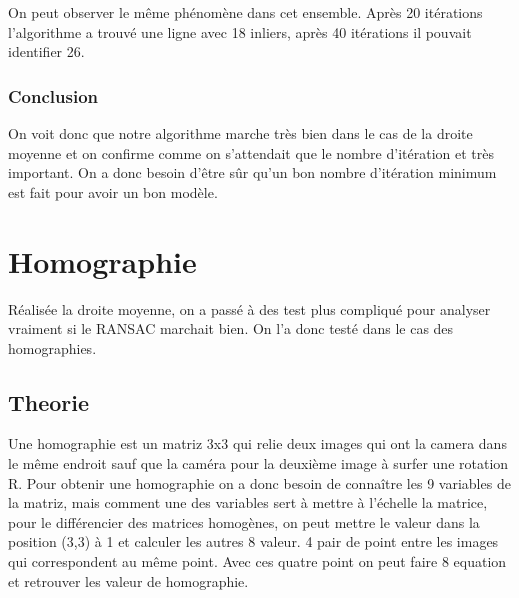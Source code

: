\documentclass[11pt]{article}
\begin{document}
\begin{figure}[H]
\begin{minipage}{.5\textwidth}
  \label{fig:test2}
\end{minipage}
\end{figure}

On peut observer le même phénomène dans cet ensemble. Après 20 itérations l'algorithme a trouvé une ligne avec 18 inliers, après 40 itérations il pouvait identifier 26. 

\subsubsection{Conclusion}

On voit donc que notre algorithme marche très bien dans le cas de la droite moyenne et on confirme comme on s'attendait que le nombre d'itération et très important. On a donc besoin d’être sûr qu’un bon nombre d'itération minimum est fait pour avoir un bon modèle.

\section{Homographie}

Réalisée la droite moyenne, on a passé à des test plus compliqué pour analyser vraiment si le RANSAC marchait bien. On l’a donc testé dans le cas des homographies. 

\subsection{Theorie}

Une homographie est un matriz 3x3 qui relie deux images qui ont la camera dans le même endroit sauf que la caméra pour la deuxième image à surfer une rotation R. Pour obtenir une homographie on a donc besoin de connaître les 9 variables de la matriz, mais comment une des variables sert à mettre à l'échelle la matrice, pour le différencier des matrices homogènes, on peut mettre le valeur dans la position (3,3) à 1 et calculer les autres 8 valeur.  4 pair de point entre les images qui correspondent au même point. Avec ces quatre point on peut faire 8 equation et retrouver les valeur de homographie. \\
\end{document}
